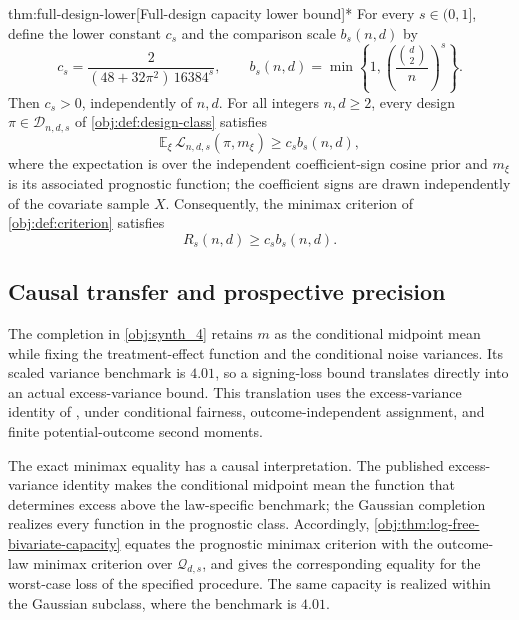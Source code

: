 \begin{theoremv}{thm:full-design-lower}[Full-design capacity lower bound]*
For every \(s\in(0,1]\), define the lower constant \(c_s\) and the comparison scale \(b_s(n,d)\) by
\[
c_s=\frac{2}{(48+32\pi^2)\,16384^s},
\qquad
b_s(n,d)=\min\left\{1,\left(\frac{\binom d2}{n}\right)^s\right\}.
\]
Then \(c_s>0\), independently of \(n,d\). For all integers \(n,d\geq2\), every design \(\pi\in\mathcal D_{n,d,s}\) of \cref{obj:def:design-class} satisfies
\[
\mathbb E_\xi\,\mathcal L_{n,d,s}(\pi,m_\xi)
\geq c_s b_s(n,d),
\]
where the expectation is over the independent coefficient-sign cosine prior and \(m_\xi\) is its associated prognostic function; the coefficient signs are drawn independently of the covariate sample \(X\). Consequently, the minimax criterion of \cref{obj:def:criterion} satisfies
\[
R_s(n,d)\geq c_s b_s(n,d).
\]
\end{theoremv}

\subsection{Causal transfer and prospective precision}

The completion in \cref{obj:synth_4} retains \(m\) as the conditional midpoint mean while fixing the treatment-effect function and the conditional noise variances. Its scaled variance benchmark is \(4.01\), so a signing-loss bound translates directly into an actual excess-variance bound. This translation uses the excess-variance identity of \citet[Proposition~2.3 (Excess Variance), equation~(2.4), with Assumption~2.1 and Definition~2.2]{Cytrynbaum2026Limits}, under conditional fairness, outcome-independent assignment, and finite potential-outcome second moments.

The exact minimax equality has a causal interpretation. The published excess-variance identity makes the conditional midpoint mean the function that determines excess above the law-specific benchmark; the Gaussian completion realizes every function in the prognostic class. Accordingly, \cref{obj:thm:log-free-bivariate-capacity} equates the prognostic minimax criterion with the outcome-law minimax criterion over \(\mathcal Q_{d,s}\), and gives the corresponding equality for the worst-case loss of the specified procedure. The same capacity is realized within the Gaussian subclass, where the benchmark is \(4.01\).

